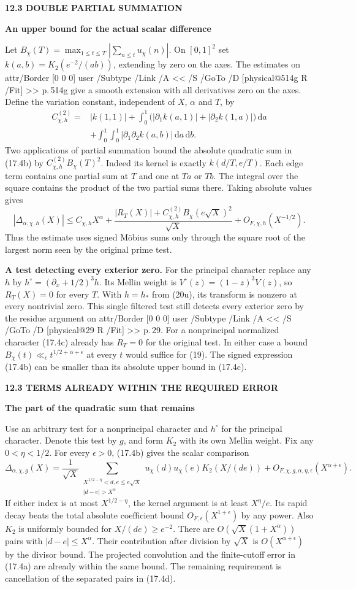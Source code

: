 \documentclass[11pt,letterpaper]{article}
\makeatletter
\newcommand{\rightmarktext}{}
\newcommand{\printfolio}{}
\newcommand{\leaf}[4]{\clearpage\gdef\printfolio{#1}\gdef\rightmarktext{#2}%
  {\small\sffamily\bfseries\color{ink}#3\par}\vspace{3pt}%
  {\LARGE\bfseries #4\par}\vspace{5pt}}
\newcommand{\point}[1]{\par\smallskip\textbf{#1.}\enspace\ignorespaces}
\newcommand{\dd}{\,\mathrm d}
\newcommand{\MusicPDFPageRef}[1]{\pdfpageref\csname physical@#1\endcsname\space\space 0 R}
\newcommand{\pagelink}[2]{\leavevmode\pdfstartlink attr{/Border [0 0 0]} user{%
  /Subtype /Link /A << /S /GoTo /D [\MusicPDFPageRef{#1} /Fit] >>}%
  {\color{ink}#2}\pdfendlink}
\newcommand{\pg}[1]{\pagelink{#1}{p.\,#1}}
\makeatother
\begin{document}
\leaf{514h}{A bound from short arithmetic data}{12.3 \quad DOUBLE PARTIAL SUMMATION}{An upper bound for the actual scalar difference}
Let $B_\chi(T)=\max_{1\le t\le T}|\sum_{n\le t}u_\chi(n)|$. On
$[0,1]^2$ set $k(a,b)=K_2(e^{-2}/(ab))$, extending by zero on the axes.
The estimates on \pg{514g} give a smooth extension with all derivatives
zero on the axes. Define the variation constant, independent
of $X$, $\alpha$ and $T$, by
\begin{align*}
 C_{\chi,h}^{(2)}={}&|k(1,1)|+
 \int_0^1\big(|\partial_1k(a,1)|+|\partial_2k(1,a)|\big)\dd a\\
 &+\int_0^1\int_0^1|\partial_1\partial_2k(a,b)|\dd a\dd b .
\end{align*}
Two applications of partial summation bound the absolute quadratic
sum in (17.4b) by $C_{\chi,h}^{(2)}B_\chi(T)^2$. Indeed its kernel
is exactly $k(d/T,e/T)$. Each edge term contains one partial sum
at $T$ and one at $Ta$ or $Tb$. The integral over the square contains
the product of the two partial sums there. Taking absolute values gives
\[
 |\Delta_{\alpha,\chi,h}(X)|
 \le C_{\chi,h} X^\alpha+
      \frac{|R_T(X)|+C_{\chi,h}^{(2)}B_\chi(e\sqrt X)^2}{\sqrt X}
      +O_{F,\chi,h}(X^{-1/2}).
 \tag{17.4c}
\]
Thus the estimate uses signed M\"obius sums only through the square
root of the largest norm seen by the original prime test.

\point{A test detecting every exterior zero}
For the principal character replace any $h$ by
$h^\circ=(\partial_x+1/2)^3h$. Its Mellin weight is
$V^\circ(z)=(1-z)^3 V(z)$, so $R_T(X)=0$ for every $T$.
With $h=h_*$ from (20u), its transform is nonzero at every nontrivial
zero. This single filtered test still detects every exterior zero by
the residue argument on \pg{29}. For a nonprincipal normalized
character (17.4c) already has $R_T=0$ for the original test.
In either case a bound $B_\chi(t)\ll_\epsilon
t^{1/2+\alpha+\epsilon}$ at every $t$ would suffice for (19).
The signed expression (17.4b) can be smaller than its absolute
upper bound in (17.4c).

\leaf{514i}{The separated pairs}{12.3 \quad TERMS ALREADY WITHIN THE REQUIRED ERROR}{The part of the quadratic sum that remains}
Use an arbitrary test for a nonprincipal character and $h^\circ$
for the principal character. Denote this test by $g$, and form $K_2$
with its own Mellin weight. Fix any $0<\eta<1/2$. For every
$\epsilon>0$, (17.4b) gives the scalar comparison
\[
 \Delta_{\alpha,\chi,g}(X)=
 \frac1{\sqrt X}
 \sum_{\substack{X^{1/2-\eta}<d,e\le e\sqrt X\\|d-e|>X^\alpha}}
      u_\chi(d)u_\chi(e)K_2(X/(de))
       +O_{F,\chi,g,\alpha,\eta,\epsilon}(X^{\alpha+\epsilon}).
 \tag{17.4d}
\]
If either index is at most $X^{1/2-\eta}$, the kernel argument is
at least $X^\eta/e$. Its rapid decay beats the total absolute
coefficient bound $O_{F,\epsilon}(X^{1+\epsilon})$ by any power.
Also $K_2$ is uniformly bounded for $X/(de)\ge e^{-2}$.
There are $O(\sqrt X(1+X^\alpha))$ pairs with $|d-e|\le X^\alpha$.
Their contribution after division by $\sqrt X$ is
$O(X^{\alpha+\epsilon})$ by the divisor bound.
The projected convolution and the finite-cutoff error in (17.4a)
are already within the same bound. The remaining requirement is
cancellation of the separated pairs in (17.4d).
\end{document}
